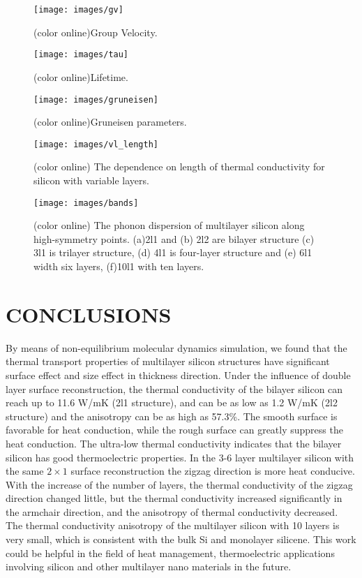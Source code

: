 \documentclass[%
 reprint,
 amsmath,amssymb,
 aps,
 prb,
]{revtex4-1}
\begin{document}
\begin{figure}[b]
\texttt{[image: images/gv]}
\caption{\label{fig:gv} (color online)Group Velocity.}
\end{figure}

\begin{figure}[b]
\texttt{[image: images/tau]}
\caption{\label{fig:tau} (color online)Lifetime.}
\end{figure}

\begin{figure}[b]
\texttt{[image: images/gruneisen]}
\caption{\label{fig:gruneisen} (color online)Gruneisen parameters.}
\end{figure}

\begin{figure}[b]
\texttt{[image: images/vl\_length]}
\caption{\label{fig:vl_length}(color online) The dependence on length of thermal conductivity for silicon with variable layers.}
\end{figure}

\begin{figure}[b]
\texttt{[image: images/bands]}
\caption{\label{fig:bands}(color online) The phonon dispersion of multilayer silicon along high-symmetry points. (a)2l1 and (b) 2l2 are bilayer structure (c) 3l1 is trilayer structure, (d) 4l1 is four-layer structure and (e) 6l1 width six layers, (f)10l1 with ten layers.}
\end{figure}

\section{CONCLUSIONS}

By means of non-equilibrium molecular dynamics simulation, we found that the thermal transport properties of multilayer silicon structures have significant surface effect and size effect in thickness direction. Under the influence of double layer surface reconstruction, the thermal conductivity of the bilayer silicon can reach up to 11.6 W/mK (2l1 structure), and can be as low as 1.2 W/mK (2l2 structure) and the anisotropy can be as high as 57.3\%. The smooth surface is favorable for heat conduction, while the rough surface can greatly suppress the heat conduction. The ultra-low thermal conductivity indicates that the bilayer silicon has good thermoelectric properties. In the 3-6 layer multilayer silicon with the same $2 \times 1$ surface reconstruction the zigzag direction is more heat conducive. With the increase of the number of layers, the thermal conductivity of the zigzag direction changed little, but the thermal conductivity increased significantly in the armchair direction, and the anisotropy of thermal conductivity decreased. The thermal conductivity anisotropy of the multilayer silicon with 10 layers is very small, which is consistent with the bulk Si and monolayer silicene. This work could be helpful in the field of heat management, thermoelectric applications involving silicon and other multilayer nano materials in the future.
\end{document}

